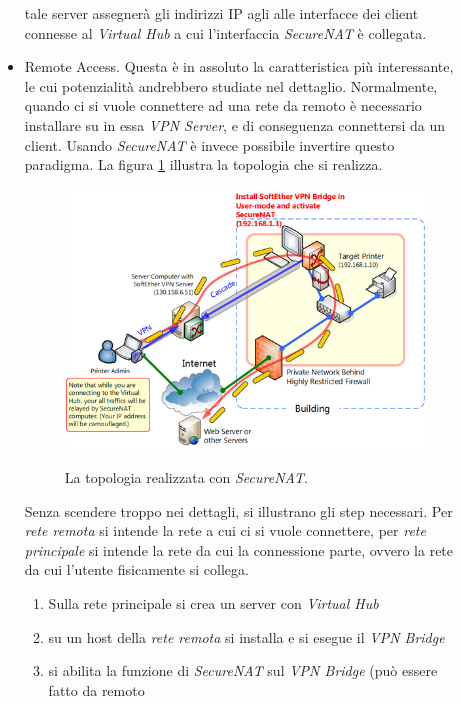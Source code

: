\begin{description}
\begin{itemize}
    tale server assegnerà gli indirizzi IP agli alle interfacce dei client connesse al \textit{Virtual Hub} a cui
    l'interfaccia \textit{SecureNAT} è collegata.
    \item Remote Access. Questa è in assoluto la caratteristica più interessante, le cui potenzialità andrebbero studiate
    nel dettaglio. Normalmente, quando ci si vuole connettere ad una rete da remoto è
    necessario installare su in essa \textit{VPN Server}, e di conseguenza connettersi da un client. Usando \textit{SecureNAT}
    è invece possibile invertire questo paradigma. La figura \ref{fig:securenat} illustra la topologia che si realizza.\\
    \begin{figure}
      \includegraphics[scale=0.55]{img/securenat}
      \label{fig:securenat}
      \caption[La topologia realizzata con \textit{SecureNAT}]{La topologia realizzata con \textit{SecureNAT}.}
    \end{figure}
    Senza scendere troppo nei dettagli, si illustrano gli step necessari. Per \textit{rete remota} si intende la rete a cui
    ci si vuole connettere, per \textit{rete principale} si intende la rete da cui la connessione parte, ovvero
    la rete da cui l'utente fisicamente si collega.
    \begin{enumerate}
      \item Sulla rete principale si crea un server con \textit{Virtual Hub}
      \item su un host della \textit{rete remota} si installa e si esegue il \textit{VPN Bridge}
      \item si abilita la funzione di \textit{SecureNAT} sul \textit{VPN Bridge} (può essere fatto da remoto

\end{enumerate}
\end{itemize}
\end{description}
